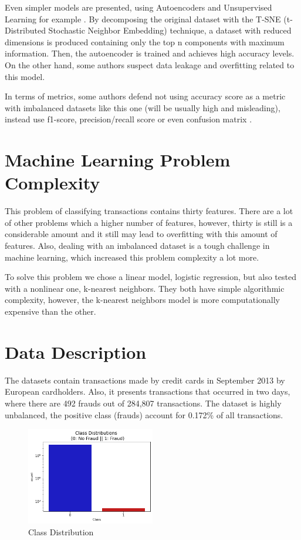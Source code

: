 \documentclass[conference]{IEEEtran}
\begin{document}
Even simpler models are presented, using Autoencoders and Unsupervised Learning for example \cite{paper_autoencoders}. By decomposing the original dataset with the T-SNE (t-Distributed Stochastic Neighbor Embedding) technique, a dataset with reduced dimensions is produced containing only the top n components with maximum information. Then, the autoencoder is trained and achieves high accuracy levels. On the other hand, some authors suspect data leakage and overfitting related to this model.

In terms of metrics, some authors defend not using accuracy score as a metric with imbalanced datasets like this one (will be usually high and misleading), instead use f1-score, precision/recall score or even confusion matrix \cite{paper_dealing_with_imbalanced}.

\section{Machine Learning Problem Complexity}

This problem of classifying transactions contains thirty features. There are a lot of other problems which a higher number of features, however, thirty is still is a considerable amount and it still may lead to overfitting with this amount of features. Also, dealing with an imbalanced dataset is a tough challenge in machine learning, which increased this problem complexity a lot more.

To solve this problem we chose a linear model, logistic regression, but also tested with a nonlinear one, k-nearest neighbors. They both have simple algorithmic complexity, however, the k-nearest neighbors model is more computationally expensive than the other.

\section{Data Description}

The datasets contain transactions made by credit cards in September 2013 by European cardholders. Also, it presents transactions that occurred in two days, where there are 492 frauds out of 284,807 transactions. The dataset is highly unbalanced, the positive class (frauds) account for 0.172\% of all transactions.

\begin{figure}[H]
    \centerline{\includegraphics[width=0.5\textwidth]{images/class_distribution.png}}
    \caption{Class Distribution}
    \label{fig:hist_test_classes}
\end{figure}
\end{document}
